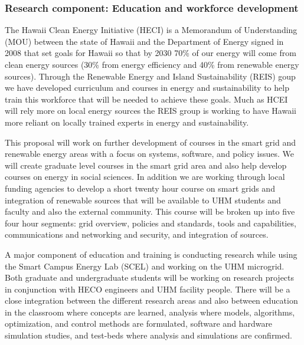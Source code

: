 
\subsubsection{Research component: Education and workforce development}
\label{sec:education}
  
The Hawaii Clean Energy Initiative (HECI) is a Memorandum of 
Understanding (MOU) between the state of  Hawaii and
the Department of Energy signed in 2008 that set goals for Hawaii so that by 2030
70\% of our energy will come from clean energy sources
(30\% from energy efficiency and 40\% from renewable energy sources).   
Through  the Renewable Energy and Island Sustainability (REIS) goup  we have developed 
curriculum and courses in energy and sustainability to help train this workforce that will be
needed to achieve these goals.  Much as HCEI will rely more on local energy sources the
REIS group is working to have Hawaii more reliant on locally trained experts in energy and
sustainability.
  
This proposal will work on further development of courses in the smart grid and renewable energy
areas with a focus on systems, software, and policy issues.   We will create graduate level courses in
the smart grid area and also help develop courses on energy in social sciences.  In addition we
are working through local funding agencies to develop a short twenty hour course on smart grids
and integration of renewable sources that will be available to UHM students and faculty and also
the external community.  This course will be broken up into five four hour segments: grid
overview,  policies and standards, tools and capabilities, communications and networking and
security, and integration of sources.

A major component of education and training is conducting research while using the Smart
Campus Energy Lab (SCEL) and working on the UHM microgrid.  Both graduate and
undergraduate students will be working on research projects in conjunction with HECO engineers
and UHM facility people.  There will be a close integration between the different research
areas and also between education in the classroom where concepts are learned, analysis where
models, algorithms, optimization, and control methods are formulated,  software and hardware
simulation studies, and test-beds where analysis and simulations are confirmed.

